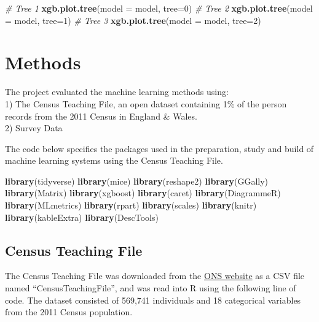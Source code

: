 \documentclass[]{book}
\newenvironment{Shaded}{\begin{snugshade}}{\end{snugshade}}
\newcommand{\KeywordTok}[1]{\textcolor[rgb]{0.13,0.29,0.53}{\textbf{#1}}}
\newcommand{\DataTypeTok}[1]{\textcolor[rgb]{0.13,0.29,0.53}{#1}}
\newcommand{\DecValTok}[1]{\textcolor[rgb]{0.00,0.00,0.81}{#1}}
\newcommand{\CommentTok}[1]{\textcolor[rgb]{0.56,0.35,0.01}{\textit{#1}}}
\newcommand{\NormalTok}[1]{#1}
\begin{document}
\begin{Shaded}
\begin{Highlighting}[]
\CommentTok{# Tree 1}
\KeywordTok{xgb.plot.tree}\NormalTok{(}\DataTypeTok{model =}\NormalTok{ model, }\DataTypeTok{tree=}\DecValTok{0}\NormalTok{)}
\CommentTok{# Tree 2}
\KeywordTok{xgb.plot.tree}\NormalTok{(}\DataTypeTok{model =}\NormalTok{ model, }\DataTypeTok{tree=}\DecValTok{1}\NormalTok{)}
\CommentTok{# Tree 3}
\KeywordTok{xgb.plot.tree}\NormalTok{(}\DataTypeTok{model =}\NormalTok{ model, }\DataTypeTok{tree=}\DecValTok{2}\NormalTok{)}
\end{Highlighting}
\end{Shaded}

\chapter{Methods}\label{methods-1}

The project evaluated the machine learning methods using:\\
1) The Census Teaching File, an open dataset containing 1\% of the
person records from the 2011 Census in England \& Wales.\\
2) Survey Data

The code below specifies the packages used in the preparation, study and
build of machine learning systems using the Census Teaching File.

\begin{Shaded}
\begin{Highlighting}[]
\KeywordTok{library}\NormalTok{(tidyverse)}
\KeywordTok{library}\NormalTok{(mice)}
\KeywordTok{library}\NormalTok{(reshape2)}
\KeywordTok{library}\NormalTok{(GGally)}
\KeywordTok{library}\NormalTok{(Matrix)}
\KeywordTok{library}\NormalTok{(xgboost)}
\KeywordTok{library}\NormalTok{(caret)}
\KeywordTok{library}\NormalTok{(DiagrammeR)}
\KeywordTok{library}\NormalTok{(MLmetrics)}
\KeywordTok{library}\NormalTok{(rpart)}
\KeywordTok{library}\NormalTok{(scales)}
\KeywordTok{library}\NormalTok{(knitr)}
\KeywordTok{library}\NormalTok{(kableExtra)}
\KeywordTok{library}\NormalTok{(DescTools)}
\end{Highlighting}
\end{Shaded}

\section{Census Teaching File}\label{census-teaching-file}

The Census Teaching File was downloaded from the
\href{https://www.ons.gov.uk/census/2011census/2011censusdata/censusmicrodata/microdatateachingfile}{ONS
website} as a CSV file named ``CensusTeachingFile'', and was read into R
using the following line of code. The dataset consisted of 569,741
individuals and 18 categorical variables from the 2011 Census
population.
\end{document}
